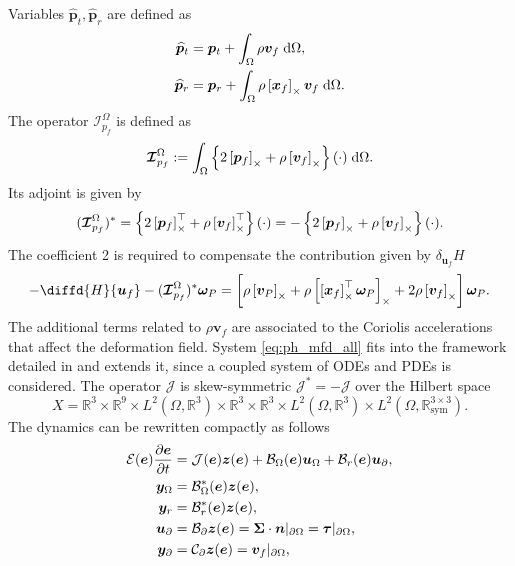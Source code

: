 Variables $\widehat{\bm{p}}_t, \widehat{\bm{p}}_r$ are defined as
\begin{equation}
\label{eq:mod_momenta}
\begin{aligned}
\widehat{\bm{p}}_t &= \bm{p}_t + \int_{\Omega} \rho \bm{v}_f \d{\Omega}, \\
\widehat{\bm{p}}_r &= \bm{p}_r + \int_{\Omega} \rho \crmat{\bm{x}_f}\bm{v}_f \d{\Omega}. \\
\end{aligned}
\end{equation}
The operator $\bm{\mathcal{I}}_{p_f}^\Omega$ is defined as 
\begin{equation}
\label{eq:mod_momentafl}
\bm{\mathcal{I}}_{p_f}^\Omega := \int_\Omega \left\{2 \crmat{\bm{p}_f} + \rho \crmat{\bm{v}_f} \right\}(\cdot) \d{\Omega}.
\end{equation}
Its  adjoint is given by
\begin{equation*}
(\bm{\mathcal{I}}_{p_f}^\Omega)^* = \left\{2 \left[\bm{p}_f\right]_\times^\top + \rho \left[\bm{v}_f\right]_\times^\top \right\}(\cdot) = - \left\{2 \left[\bm{p}_f\right]_\times + \rho \left[\bm{v}_f\right]_\times \right\}(\cdot).
\end{equation*} 
The coefficient 2 is required to compensate the contribution given by $\delta_{\bm{u}_f} H$ 
\[
-\diffd{H}{\bm{u}_f} - (\bm{\mathcal{I}}_{p_f}^\Omega)^* \bm{\omega}_P = \left[\rho \crmat{\bm{v}_P} + \rho \crmat{\crmat{\bm{x}_f}^\top \bm\omega_P} + 2 \rho \crmat{\bm{v}_f} \right] \bm\omega_P.
\]
The additional terms related to $\rho \bm{v}_f$ are associated to the Coriolis accelerations that affect the deformation field. System \eqref{eq:ph_mfd_all} fits into the framework detailed in \cite{mehrmann2019structurepreserving} and extends it, since a coupled system of ODEs and PDEs is considered. The operator $\bm{\mathcal{J}}$ is skew-symmetric $\bm{\mathcal{J}}_{}^*=-\bm{\mathcal{J}}$ over the Hilbert space
\[
X = \mathbb{R}^3 \times \mathbb{R}^9 \times L^2(\Omega, \mathbb{R}^{3}) \times \mathbb{R}^3 \times \mathbb{R}^3 \times L^2(\Omega, \mathbb{R}^{3}) \times L^2(\Omega, \mathbb{R}^{3\times 3}_{\text{sym}}).
\] 
The dynamics can be rewritten compactly as follows
\begin{equation}
\label{eq:MFD_pHDAE}
\begin{aligned}
\mathcal{E}(\bm{e}) \diffp{\bm{e}}{t} &= \mathcal{J}(\bm{e}) \bm{z}(\bm{e}) + \mathcal{B}_\Omega(\bm{e}) \bm{u}_\Omega + \mathcal{B}_r(\bm{e}) \bm{u}_\partial, \\
\bm{y}_\Omega &= \mathcal{B}_\Omega^*(\bm{e}) \bm{z}(\bm{e}), \\
\bm{y}_r &= \mathcal{B}_r^*(\bm{e}) \bm{z}(\bm{e}), \\
\bm{u}_\partial &= \mathcal{B}_{\partial} \bm{z}(\bm{e}) =  \bm\Sigma \cdot \bm{n}|_{\partial \Omega} = \bm\tau|_{\partial \Omega}, \\
\bm{y}_\partial &= \mathcal{C}_{\partial} \bm{z}(\bm{e}) = \bm{v}_f|_{\partial \Omega},
\end{aligned}
\end{equation}
